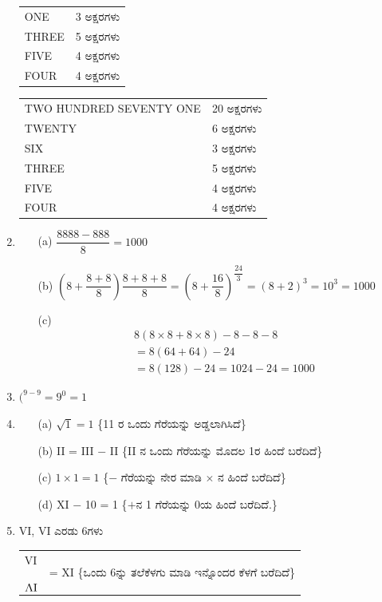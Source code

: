 \begin{enumerate}
\begin{tabular}[t]{ll}
ONE & 3 ಅಕ್ಷರಗಳು\\
THREE & 5 ಅಕ್ಷರಗಳು\\
FIVE & 4 ಅಕ್ಷರಗಳು\\
FOUR & 4 ಅಕ್ಷರಗಳು
\end{tabular}

\begin{tabular}[t]{ll}
TWO HUNDRED SEVENTY ONE & 20 ಅಕ್ಷರಗಳು\\
TWENTY & 6 ಅಕ್ಷರಗಳು\\
SIX & 3 ಅಕ್ಷರಗಳು\\
THREE & 5 ಅಕ್ಷರಗಳು\\
FIVE & 4 ಅಕ್ಷರಗಳು\\
FOUR & 4 ಅಕ್ಷರಗಳು
\end{tabular}

\item 
\begin{itemize}
\item[(a)] $\dfrac{8888 - 888}{8} = 1000$
\item[(b)] $\left(8 + \dfrac{8 + 8}{8}\right) \dfrac{8+8+8}{8} = \left(8 + \dfrac{16}{8}\right)^{\dfrac{24}{3}} = (8 + 2)^{3} = 10^{3} = 1000$
\item[(c)] 
\begin{align*}
& 8(8\times 8 + 8\times 8) - 8 - 8 - 8\\
& = 8(64 + 64) - 24\\
& = 8(128) - 24 = 1024 - 24 = 1000
\end{align*}
\end{itemize}

\item $(^{9-9} = 9^{0} = 1$

\item 
\begin{itemize}
\item[(a)] $\sqrt{1} = 1$ \{11 ರ ಒಂದು ಗೆರೆಯನ್ನು ಅಡ್ಡಲಾಗಿಸಿದೆ\}
\item[(b)] II = III $-$ II \{II ನ ಒಂದು ಗೆರೆಯನ್ನು ಮೊದಲ 1ರ ಹಿಂದೆ ಬರೆದಿದೆ\}
\item[(c)] $1\times 1 = 1$ \{$-$ ಗೆರೆಯನ್ನು ನೇರ ಮಾಡಿ $\times$ ನ ಹಿಂದೆ ಬರೆದಿದೆ\}
\item[(d)] XI $-$ 10 = 1 \{$+$ನ 1 ಗೆರೆಯನ್ನು 0ಯ ಹಿಂದೆ ಬರೆದಿದೆ.\}
\end{itemize}

\item VI, VI ಎರಡು 6ಗಳು 

\begin{tabular}[t]{ll}
VI & \multirow{2}{*}{= {\rm XI} \{ಒಂದು 6ನ್ನು ತಲೆಕೆಳಗು ಮಾಡಿ ಇನ್ನೊಂದರ ಕೆಳಗೆ ಬರೆದಿದೆ\}}\\[-7pt]	
${\rotatebox{180}{IV}}$ &\\
\end{tabular}


\end{enumerate}
